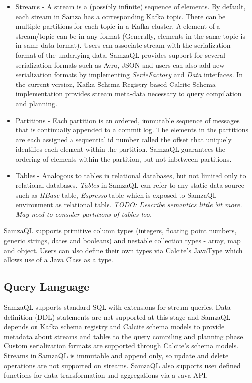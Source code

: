 \documentclass[10pt, conference, compsocconf]{IEEEtran}
\begin{document}
\begin{itemize}
\item Streams - A stream is a (possibly infinite) sequence of elements. By default, each stream in Samza has a corresponding Kafka \cite{kreps2011kafka} topic. There can be multiple partitions for each topic in a Kafka cluster. A element of a stream/topic can be in any format (Generally, elements in the same topic is in same data format). Users can associate stream with the serialization format of the underlying data. SamzaQL provides support for several serialization formats such as Avro, JSON and users can also add new serialization formats by implementing \textit{SerdeFactory} and \textit{Data} interfaces. In the current version, Kafka Schema Registry based Calcite Schema implementation provides stream meta-data necessary to query compilation and planning.
\item Partitions - Each partition is an ordered, immutable sequence of messages that is continually appended to a commit log. The elements in the partitions are each assigned a sequential id number called the offset that uniquely identifies each element within the partition. SamzaQL guarantees the ordering of elements within the partition, but not inbetween partitions.
\item Tables - Analogous to tables in relational databases, but not limited only to relational databases. \textit{Tables} in SamzaQL can refer to any static data source such as \textit{HBase} table, \textit{Espresso} table  which is exposed to SamzaQL environment as relational table. \textit{TODO: Describe semantics little bit more. May need to consider partitions of tables too.}
\end{itemize}

SamzaQL supports primitive column types (integers, floating
point numbers, generic strings, dates and booleans) and
nestable collection types - array, map and object. Users can also define their own types via Calcite's JavaType which allows use of a Java Class as a type.

\subsection{Query Language}
SamzaQL supports standard SQL with extensions for stream queries. Data definition (DDL) statements are not supported at this stage and SamzaQL depends on Kafka schema registry and Calcite schema models to provide metadata about streams and tables to the query compiling and planning phase. Custom serialization formats are supported through Calcite's schema models.
Streams in SamzaQL is immutable and append only, so update and delete operations are not supported on streams. SamzaQL also supports user defined functions for data transformation and aggregations via a Java API.
\end{document}
